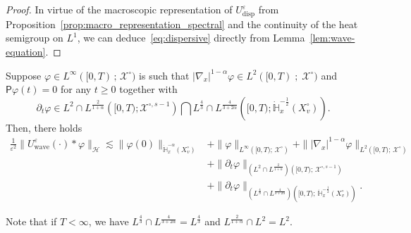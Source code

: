 \documentclass[AHL,Unicode,longabstracts,published]{cedram}
\newcommand{\Wave}{\mathrm{wave}}
\newcommand{\disp}{\mathrm{disp}}
\newcommand{\bbH}{\mathbb{H}}
\newcommand{\XX}{\mathcal{X}}
\newcommand{\PP}{\mathsf{P}}
\newcommand{\HHH}{\mathscr{H}}
\newcommand{\SSSs}{\HHH}
\newcommand{\Slm}{X^{\circ}}
\newcommand{\SSlm}{\XX^{\circ}}
\newcommand{\rSSlm}[1]{\XX^{{\circ}, #1}}
\renewcommand*\ge{\geqslant}
\newcommand*\eps{{\varepsilon}}
\begin{document}
\begin{proof}
In virtue of the macroscopic representation of $U^\eps_\disp$ from Proposition~\ref{prop:macro_representation_spectral} and the continuity of the heat semigroup on $L^1$, we can deduce~\eqref{eq:dispersive} directly from Lemma~\ref{lem:wave-equation}.
\end{proof}

\begin{lemm}\label{lem:convolution_wave}
Suppose $\varphi \in L^{\infty}([0,T)\,;\,\SSlm)$ is such that $|\nabla_{x}|^{1-\alpha}\varphi \in L^{2}([0,T)\;;\;\SSlm)$ and $\PP \varphi(t) = 0$ for any $t\ge0$ together with
\[
\partial_t\varphi \in L^2 \cap L^{ \frac{2}{1+\alpha} } \left([0, T) ; \rSSlm{s-1}\right) \bigcap L^{\frac{4}{3}} \cap L^{\frac{4}{3 + 2 \alpha}} \left([0, T) ; \dot{\bbH}^{-\frac{1}{2}}_x \left(\Slm_v\right) \right).
\]
Then, there holds
\begin{align*}
\frac{1}{\eps^2} \| U^\eps_\Wave(\cdot) * \varphi \|_{\SSSs} \lesssim \| \varphi(0) \|_{ \dot{\bbH}^{-\alpha}_x \left(\Slm_v \right) } & + \| \varphi \|_{ L^\infty \left([0, T);\,\SSlm \right) } + \| | \nabla_x|^{1 - \alpha} \varphi \|_{ L^2 \left([0, T);\,\SSlm \right) } \\
& + \| \partial_t \varphi \|_{ \left(L^2 \cap L^{ \frac{2}{1+\alpha} }\right) \left([0, T);\,\rSSlm{s-1} \right) } \\
& + \| \partial_t \varphi \|_{ \left(L^{ \frac{4}{3} } \cap L^{\frac{4}{3 + 2 \alpha}}\right) \left([0, T);\, \dot{\bbH}^{-\frac{1}{2}}_x \left(\Slm_v\right) \right) }.
\end{align*}
\end{lemm}

\begin{rema}
Note that if $T < \infty$, we have $L^{\frac{4}{3}} \cap L^{\frac{4}{3+2\alpha}}=L^{\frac{4}{3}}$ and $L^{\frac{2}{1+\alpha}}\cap L^2=L^2$.
\end{rema}
\end{document}
